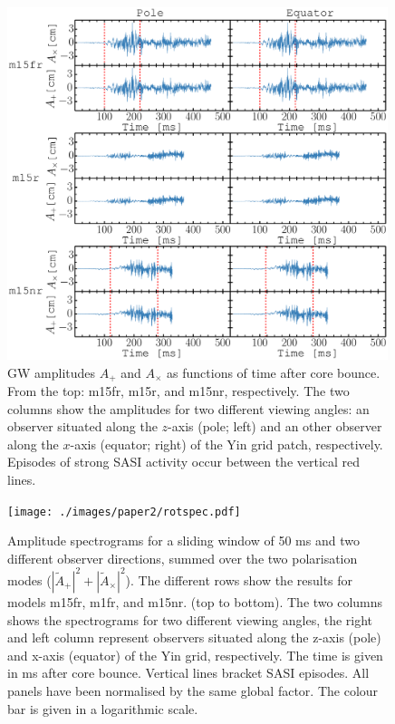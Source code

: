\begin{figure}           
\centering                            
\includegraphics[width=0.99\textwidth]{./images/paper2/amps.pdf}
\caption{GW amplitudes $A_+$ and $A_\times$ as functions of time after core bounce.
  From the top: m15fr, m15r, and m15nr, respectively. 
  The two columns show the amplitudes for two different viewing angles: an observer
  situated along the $z$-axis (pole; left) and an other observer along the $x$-axis (equator; right) of the Yin grid patch, respectively.
  Episodes of strong SASI activity occur between the vertical red lines.  \label{figp2:amps}}
\end{figure}
\begin{figure}[ht]
\centering                            
\texttt{[image: ./images/paper2/rotspec.pdf]}
\caption{Amplitude spectrograms for a sliding window of 50 ms and two different observer
  directions, summed over the two polarisation modes 
  ($|\widetilde{A}_+|^2 + |\widetilde{A}_\times|^2$). The
  different rows show the results for models m15fr, m1fr, and m15nr. (top to bottom).
  The two columns shows the spectrograms for two different viewing angles, the right and left column represent
  observers situated along the z-axis (pole) and x-axis (equator) of the Yin grid, respectively.
  The time is given in ms after core bounce. Vertical lines bracket SASI episodes. All panels have been normalised by the same global factor.
  The colour bar is given in a logarithmic scale. \label{figp2:spec}}
\end{figure}

